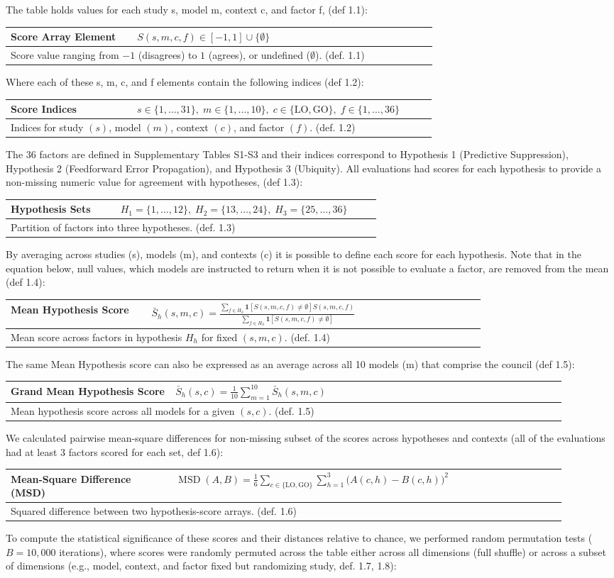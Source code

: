 \documentclass[12pt]{article}
\renewcommand{\arraystretch}{1.06}
\newcommand{\EquationBox}[3]{%
  \begin{center}
  \begingroup
  \small
  \setlength{\tabcolsep}{6pt}%
  \renewcommand{\arraystretch}{1.18}%
  \begin{tabular}{|p{0.27\linewidth}|p{0.64\linewidth}|}
  \hline
  \textbf{#1} & #2 \\
  \hline
  \multicolumn{2}{|p{0.94\linewidth}|}{#3} \\
  \hline
  \end{tabular}
  \endgroup
  \end{center}
}
\begin{document}
The table holds values for each study s, model m, context c, and factor f, (def 1.1):
\EquationBox{Score Array Element}{\(S(s,m,c,f) \in [-1,1]\cup\{\emptyset\}\)}{Score value ranging from \(-1\) (disagrees) to \(1\) (agrees), or undefined (\(\emptyset\)). (def. 1.1)}
Where each of these s, m, c, and f elements contain the following indices (def 1.2):
\EquationBox{Score Indices}{\(s\in\{1,\ldots,31\},\; m\in\{1,\ldots,10\},\; c\in\{\mathrm{LO},\mathrm{GO}\},\; f\in\{1,\ldots,36\}\)}{Indices for study \((s)\), model \((m)\), context \((c)\), and factor \((f)\). (def. 1.2)}
The 36 factors are defined in Supplementary Tables S1-S3 and their indices correspond to Hypothesis 1 (Predictive Suppression), Hypothesis 2 (Feedforward Error Propagation), and Hypothesis 3 (Ubiquity). All evaluations had scores for each hypothesis to provide a non-missing numeric value for agreement with hypotheses, (def 1.3):
\EquationBox{Hypothesis Sets}{\(H_1=\{1,\ldots,12\},\; H_2=\{13,\ldots,24\},\; H_3=\{25,\ldots,36\}\)}{Partition of factors into three hypotheses. (def. 1.3)}
By averaging across studies (s), models (m), and contexts (c) it is possible to define each score for each hypothesis. Note that in the equation below, null values, which models are instructed to return when it is not possible to evaluate a factor, are removed from the mean (def 1.4):
\EquationBox{Mean Hypothesis Score}{\(\displaystyle \bar{S}_h(s,m,c)=\frac{\sum_{f\in H_h}\mathbf{1}[S(s,m,c,f)\ne\emptyset]S(s,m,c,f)}{\sum_{f\in H_h}\mathbf{1}[S(s,m,c,f)\ne\emptyset]}\)}{Mean score across factors in hypothesis \(H_h\) for fixed \((s,m,c)\). (def. 1.4)}
The same Mean Hypothesis score can also be expressed as an average across all 10 models (m) that comprise the council (def 1.5):
\EquationBox{Grand Mean Hypothesis Score}{\(\displaystyle \bar{S}_h(s,c)=\frac{1}{10}\sum_{m=1}^{10}\bar{S}_h(s,m,c)\)}{Mean hypothesis score across all models for a given \((s,c)\). (def. 1.5)}
We calculated pairwise mean-square differences for non-missing subset of the scores across hypotheses and contexts (all of the evaluations had at least 3 factors scored for each set, def 1.6):
\EquationBox{Mean-Square Difference (MSD)}{\(\displaystyle \operatorname{MSD}(A,B)=\frac{1}{6}\sum_{c\in\{\mathrm{LO},\mathrm{GO}\}}\sum_{h=1}^{3}\bigl(A(c,h)-B(c,h)\bigr)^2\)}{Squared difference between two hypothesis-score arrays. (def. 1.6)}
To compute the statistical significance of these scores and their distances relative to chance, we performed random permutation tests ($B = 10{,}000$ iterations), where scores were randomly permuted across the table either across all dimensions (full shuffle) or across a subset of dimensions (e.g., model, context, and factor fixed but randomizing study, def. 1.7, 1.8):
\end{document}
